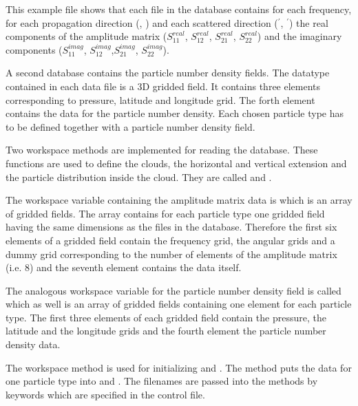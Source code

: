 This example file shows that each file in the database contains for
each frequency, for each propagation direction (\ScaZa, \ScaAa) and
each scattered direction (\ScaZa$^\prime$, \ScaAa$^\prime$) the real
components of the amplitude matrix ($S^{real}_{11}$, $S^{real}_{12}$,
$S^{real}_{21}$, $S^{real}_{22}$) and the imaginary components
($S^{imag}_{11}$, $S^{imag}_{12}$,$S^{imag}_{21}$, $S^{imag}_{22}$).

\label{sec:scattering:pnd_data}

A second database contains the particle number density fields.  The
datatype contained in each data file is a 3D gridded field. It
contains three elements corresponding to pressure, latitude and
longitude grid. The forth element contains the data for the particle
number density. Each chosen particle type has to be defined together
with a particle number density field.

\label{sec:scattering:read_data}

Two workspace methods are implemented for reading the database. These
functions are used to define the clouds, the horizontal and vertical
extension and the particle distribution inside the cloud. They are
called  and .

The workspace variable containing the amplitude matrix data is
 which is an array of gridded fields. The
array contains for each particle type one gridded field having the
same dimensions as the files in the database. Therefore the first six
elements of a gridded field contain the frequency grid, the angular
grids and a dummy grid corresponding to the number of elements of the
amplitude matrix (i.e. 8) and the seventh element contains the data
itself.

The analogous workspace variable for the particle number density field
is called  which as well is an array of
gridded fields containing one element for each particle type. The
first three elements of each gridded field contain the pressure, the
latitude and the longitude grids and the fourth element the particle
number density data.

The workspace method  is used for
initializing  and .
The method  puts the data for one particle
type into  and . The
filenames are passed into the methods by keywords which are specified
in the control file.

